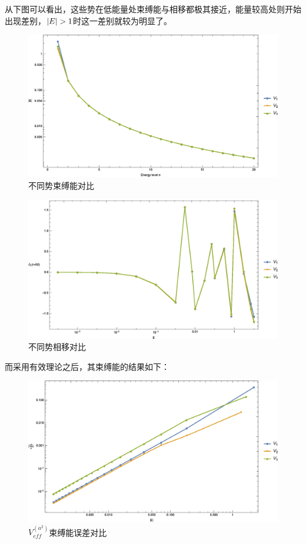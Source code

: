 \documentclass[hyperref,cs4size,titlepage,twoside]{ctexart}
\begin{document}
从下图可以看出，这些势在低能量处束缚能与相移都极其接近，能量较高处则开始出现差别，$\abs{E}>1$时这一差别就较为明显了。
\begin{figure}[!htbp]
  \centering
  \includegraphics[width=6in]{MultiplePotential_1.eps}
  \caption{不同势束缚能对比}
\end{figure}
\begin{figure}[!htbp]
  \centering
  \includegraphics[width=6in]{MultiplePotential_2.eps}
  \caption{不同势相移对比}
\end{figure}
\clearpage
而采用有效理论之后，其束缚能的结果如下：
\begin{figure}[!htbp]
  \centering
  \includegraphics[width=6in]{MultiplePotential_3.eps}
  \caption{$V_{eff}^{(a^2)}$束缚能误差对比}
\end{figure}
\end{document}
